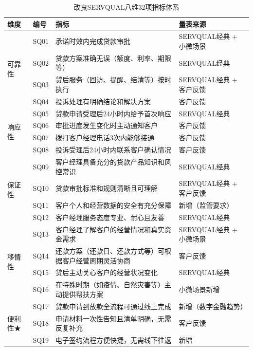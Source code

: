 \begin{table}[htbp]
  \centering
  \small
  \caption{改良SERVQUAL八维32项指标体系}
  \label{tab:4-indicators}
  \begin{tabularx}{\textwidth}{l p{1.2cm} p{7.0cm} p{4.5cm}}
    \toprule
    \textbf{维度} & \textbf{编号} & \textbf{指标} & \textbf{量表来源} \\
    \midrule
    \multirow{4}{*}{可靠性} & SQ01 & 承诺时效内完成贷款审批 & SERVQUAL经典 + 小微场景 \\
    & SQ02 & 贷款方案准确无误（额度、利率、期限等） & SERVQUAL经典 \\
    & SQ03 & 贷后服务（回访、提醒、结清等）按时执行 & SERVQUAL经典 + 客户反馈 \\
    & SQ04 & 投诉处理有明确结论和解决方案 & 客户反馈 \\
    \cmidrule{2-4}
    \multirow{4}{*}{响应性} & SQ05 & 贷款申请受理后24小时内给予首次响应 & SERVQUAL经典 \\
    & SQ06 & 审批进度发生变化时主动通知客户 & 客户反馈 \\
    & SQ07 & 拨打客户经理电话3次内能够接通 & 客户反馈 \\
    & SQ08 & 投诉受理后24小时内联系客户确认情况 & 客户反馈 \\
    \cmidrule{2-4}
    \multirow{4}{*}{保证性} & SQ09 & 客户经理具备充分的贷款产品知识和风控常识 & SERVQUAL经典 \\
    & SQ10 & 贷款审批标准和规则清晰且可理解 & SERVQUAL经典 + 客户反馈 \\
    & SQ11 & 客户个人和经营数据的安全有充分保障 & 新增（监管要求） \\
    & SQ12 & 客户经理服务态度专业、耐心且友善 & SERVQUAL经典 \\
    \cmidrule{2-4}
    \multirow{4}{*}{移情性} & SQ13 & 客户经理了解客户的经营情况和真实资金需求 & SERVQUAL经典 + 小微场景 \\
    & SQ14 & 还款方案（还款日、还款方式等）可根据客户经营周期灵活协商 & 客户反馈 \\
    & SQ15 & 贷后主动关心客户的经营状况变化 & SERVQUAL经典 \\
    & SQ16 & 在特殊时期（如疫情、自然灾害等）主动提供帮扶方案 & 小微场景新增 \\
    \cmidrule{2-4}
    \multirow{4}{*}{便利性★} & SQ17 & 贷款申请到放款全流程可通过线上完成 & 新增（数字金融趋势） \\
    & SQ18 & 申请材料一次性告知且清单明确，无需反复补充 & 客户反馈 \\
    & SQ19 & 电子签约流程方便快捷，无需线下往返 & 新增 \\

\end{tabularx}
\end{table}
